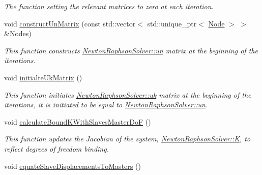 \begin{DoxyCompactItemize}
\begin{DoxyCompactList}\small\item\em The function setting the relevant matrices to zero at each iteration. \end{DoxyCompactList}\item 
\hypertarget{classNewtonRaphsonSolver_af759360cc54ea9515deb3cc2ecc83377}{}void \hyperlink{classNewtonRaphsonSolver_af759360cc54ea9515deb3cc2ecc83377}{construct\+Un\+Matrix} (const std\+::vector$<$ std\+::unique\+\_\+ptr$<$ \hyperlink{classNode}{Node} $>$ $>$ \&Nodes)\label{classNewtonRaphsonSolver_af759360cc54ea9515deb3cc2ecc83377}

\begin{DoxyCompactList}\small\item\em This function constructs \hyperlink{classNewtonRaphsonSolver_a89a6e2f583c785b77b967e6f0e9f5893}{Newton\+Raphson\+Solver\+::un} matrix at the beginning of the iterations. \end{DoxyCompactList}\item 
\hypertarget{classNewtonRaphsonSolver_a48b7753542f36889cd030104937d76a3}{}void \hyperlink{classNewtonRaphsonSolver_a48b7753542f36889cd030104937d76a3}{initialte\+Uk\+Matrix} ()\label{classNewtonRaphsonSolver_a48b7753542f36889cd030104937d76a3}

\begin{DoxyCompactList}\small\item\em This function initiates \hyperlink{classNewtonRaphsonSolver_ad217268afdeb4838d3b58f075762de95}{Newton\+Raphson\+Solver\+::uk} matrix at the beginning of the iterations, it is initiated to be equal to \hyperlink{classNewtonRaphsonSolver_a89a6e2f583c785b77b967e6f0e9f5893}{Newton\+Raphson\+Solver\+::un}. \end{DoxyCompactList}\item 
void \hyperlink{classNewtonRaphsonSolver_aa1e2ec4519853c9acfaf120c4b513651}{calculate\+Bound\+K\+With\+Slaves\+Master\+Do\+F} ()
\begin{DoxyCompactList}\small\item\em This function updates the Jacobian of the system, \hyperlink{classNewtonRaphsonSolver_a4e9ffc424dd37c6c00f9de3d7ac455ed}{Newton\+Raphson\+Solver\+::\+K}, to reflect degrees of freedom binding. \end{DoxyCompactList}\item 
\hypertarget{classNewtonRaphsonSolver_ad1670a14238d705e839d7bd80fb42c13}{}void \hyperlink{classNewtonRaphsonSolver_ad1670a14238d705e839d7bd80fb42c13}{equate\+Slave\+Displacements\+To\+Masters} ()\label{classNewtonRaphsonSolver_ad1670a14238d705e839d7bd80fb42c13}


\end{DoxyCompactItemize}
